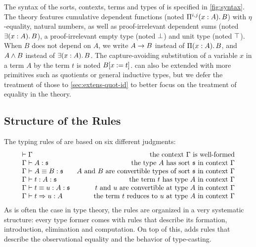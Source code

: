 The syntax of the sorts, contexts, terms and types of \SetoidTT is
specified in \cref{fig:syntax}.
%
The theory features cumulative dependent functions (noted $\Depfunannotated{A}{B}{s}{i}{j}$) with
\( \eta \)-equality, natural numbers, as well as proof-irrelevant dependent
sums (noted $\Exists{A}{B}$), a proof-irrelevant empty type (noted
$\Empty$) and unit type (noted $\Unit$).
%
When \( B \) does not depend on \( A \), we write \( \Fun{A}{B} \) instead of
\( \Depfun{A}{B} \), and \( \Prod{A}{B} \) instead of \( \Exists{A}{B} \). The capture-avoiding
substitution of a variable \( x \) in a term \( A \) by the term \( t \) is noted
\( \subst{B}{t} \).
%
\SetoidTT can also be extended with more primitives such as quotients or general inductive types,
but we defer the treatment of those to \cref{sec:extens-quot-id} to better focus on the
treatment of equality in the theory.

\subsection{Structure of the Rules}

The typing rules of \SetoidTT are based on six different judgments: 
\[
  \begin{array}{lr}
    \wfctx{\Gamma} & \text{the context \( \Gamma \) is well-formed} \\
    \tytm{\Gamma}{A}{\Univ} & \text{the type \( A \) has sort \( \Univ \) in context \( \Gamma \)} \\
    \eqtm{\Gamma}{A}{B}{\Univ} & \text{\( A \) and \( B \) are convertible types of sort \( \Univ \) in context \( \Gamma \)} \\
    \tytmannotated{\Gamma}{t}{A}{\Univ} & \text{the term \( t \) has type \( A \) in context \( \Gamma \)} \\
    \eqtmannotated{\Gamma}{t}{u}{A}{\Univ} & \text{\( t \) and \( u \) are convertible at type \( A \) in context \( \Gamma \)} \\
    \redannotated{\Gamma}{t}{u}{A} & \qquad\text{the term \( t \) reduces to \( u \) at type \( A \) in context \( \Gamma \)}
  \end{array}
\]
As is often the case in type theory, the rules are organized in a very 
systematic structure:
% 
every type former comes with rules that describe its formation, introduction, 
elimination and computation.
% 
On top of this, \SetoidCC adds rules that describe the observational equality 
and the behavior of type-casting.

